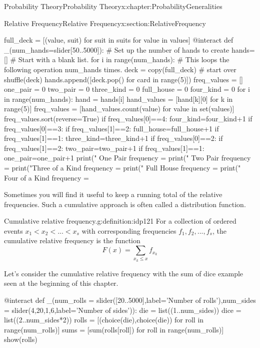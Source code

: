 \documentclass[oneside,10pt,]{book}
\numberwithin{equation}{section}
\newcommand{\lt}{<}
\begin{document}
\begin{chapterptx}{Probability Theory}{}{Probability Theory}{}{}{x:chapter:ProbabilityGeneralities}
\begin{sectionptx}{Relative Frequency}{}{Relative Frequency}{}{}{x:section:RelativeFrequency}
\begin{sageinput}
full_deck = [(value, suit) for suit in suits for value in values]
@interact
def _(num_hands=slider[50..5000]):                  # Set up the number of hands to create
    hands= []                    # Start with a blank list. 
    for i in range(num_hands):   # This loops the following operation num_hands times. 
        deck = copy(full_deck)   # start over
        shuffle(deck)
        hands.append([deck.pop() for card in range(5)])
    freq_values = []
    one_pair = 0
    two_pair = 0
    three_kind = 0
    full_house = 0
    four_kind = 0
    for i in range(num_hands):
        hand = hands[i]
        hand_values = [hand[k][0] for k in range(5)]
        freq_values = [hand_values.count(value) for value in set(values)]
        freq_values.sort(reverse=True)
        if freq_values[0]==4:
            four_kind=four_kind+1
        if freq_values[0]==3:
            if freq_values[1]==2:
                full_house=full_house+1
            if freq_values[1]==1:
                three_kind=three_kind+1
        if freq_values[0]==2:
            if freq_values[1]==2:
                two_pair=two_pair+1
            if freq_values[1]==1:
                one_pair=one_pair+1
    print("       One Pair frequency = %
    print("       Two Pair frequency = %
    print("Three of a Kind frequency = %
    print("     Full House frequency = %
    print(" Four of a Kind frequency = %
\end{sageinput}
Sometimes you will find it useful to keep a running total of the relative frequencies. Such a cumulative approach is often called a distribution function.%
\begin{definition}{Cumulative relative frequency.}{g:definition:idp121}%
For a collection of ordered events \(x_1 \lt x_2 \lt ... \lt x_s\) with corresponding frequencies \(f_1, f_2, ..., f_s\), the cumulative relative frequency is the function%
\begin{equation*}
F(x) = \sum_{x_k \le x} f_{x_k}
\end{equation*}
%
\end{definition}
Let's consider the cumulative relative frequency with the sum of dice example seen at the beginning of this chapter.%
\begin{sageinput}
@interact
def _(num_rolls = slider([20..5000],label='Number of rolls'),num_sides = slider(4,20,1,6,label='Number of sides')):
    die = list((1..num_sides))
    dice = list((2..num_sides*2))
    rolls = [(choice(die),choice(die)) for roll in range(num_rolls)]
    sums = [sum(rolls[roll]) for roll in range(num_rolls)]
    show(rolls)   


\end{sageinput}
\end{sectionptx}
\end{chapterptx}
\end{document}
